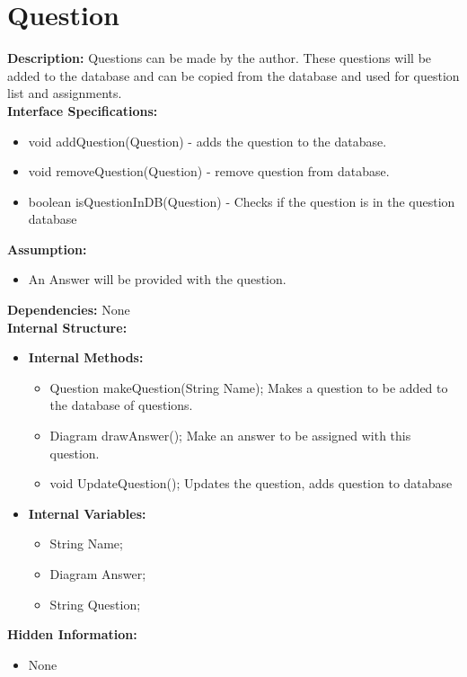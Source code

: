 \chapter{Question}

\textbf{Description: }Questions can be made by the author. These questions will be added to the database and can be copied from the database and used for question list and assignments.\\
\textbf{Interface Specifications:}
\begin{itemize}
    \item void addQuestion(Question) - adds the question to the database.
    \item void removeQuestion(Question) - remove question from database.
    \item boolean isQuestionInDB(Question) - Checks if the question is in the question database
\end{itemize}
\textbf{Assumption:}
\begin{itemize}
\item An Answer will be provided with the question.
\end{itemize}
\textbf{Dependencies:} None \\
\textbf{Internal Structure:}
\begin{itemize}
	\item \textbf{Internal Methods:}
	\begin{itemize}
	\item Question makeQuestion(String Name); Makes a question to be added to the database
of questions.
    \item Diagram drawAnswer(); Make an answer to be assigned with this question.
    \item void UpdateQuestion(); Updates the question, adds question to database
    \end{itemize}
\item 	\textbf{Internal Variables:}
	\begin{itemize}
	\item String Name;
	\item Diagram Answer;
	\item String Question;
	\end{itemize}
\end{itemize}
\textbf{Hidden Information:}
\begin{itemize}
\item None
\end{itemize}





















